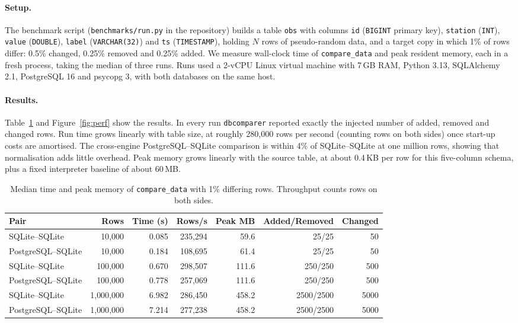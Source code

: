 \documentclass[11pt]{article}
\begin{document}
\paragraph{Setup.} The benchmark script (\texttt{benchmarks/run.py} in the
repository) builds a table \texttt{obs} with columns \texttt{id} (\texttt{BIGINT}
primary key), \texttt{station} (\texttt{INT}), \texttt{value}
(\texttt{DOUBLE}), \texttt{label} (\texttt{VARCHAR(32)}) and \texttt{ts}
(\texttt{TIMESTAMP}), holding $N$ rows of
pseudo-random data, and a target copy in which 1\% of rows differ: 0.5\%
changed, 0.25\% removed and 0.25\% added. We measure wall-clock time of
\texttt{compare\_data} and peak resident memory, each in a fresh process,
taking the median of three runs. Runs used a 2-vCPU Linux virtual machine
with 7\,GB RAM, Python 3.13, SQLAlchemy 2.1, PostgreSQL 16 and psycopg 3,
with both databases on the same host.

\paragraph{Results.} Table~\ref{tab:perf} and Figure~\ref{fig:perf} show
the results. In every run \texttt{dbcomparer} reported exactly the injected
number of added, removed and changed rows. Run time grows linearly with
table size, at roughly 280{,}000 rows per second (counting rows on both
sides) once start-up costs are amortised. The cross-engine PostgreSQL--SQLite
comparison is within 4\% of SQLite--SQLite at one million rows, showing that
normalisation adds little overhead. Peak memory grows linearly with the
source table, at about 0.4\,KB per row for this five-column schema, plus a
fixed interpreter baseline of about 60\,MB.

\begin{table}[t]
\centering
\caption{Median time and peak memory of \texttt{compare\_data} with 1\%
differing rows. Throughput counts rows on both sides.}
\label{tab:perf}
\begin{tabular}{lrrrrrr}
\toprule
Pair & Rows & Time (s) & Rows/s & Peak MB & Added/Removed & Changed\\
\midrule
SQLite--SQLite     & 10{,}000    & 0.085 & 235{,}294 & 59.6  & 25/25     & 50\\
PostgreSQL--SQLite & 10{,}000    & 0.184 & 108{,}695 & 61.4  & 25/25     & 50\\
SQLite--SQLite     & 100{,}000   & 0.670 & 298{,}507 & 111.6 & 250/250   & 500\\
PostgreSQL--SQLite & 100{,}000   & 0.778 & 257{,}069 & 111.6 & 250/250   & 500\\
SQLite--SQLite     & 1{,}000{,}000 & 6.982 & 286{,}450 & 458.2 & 2500/2500 & 5000\\
PostgreSQL--SQLite & 1{,}000{,}000 & 7.214 & 277{,}238 & 458.2 & 2500/2500 & 5000\\
\bottomrule
\end{tabular}
\end{table}
\end{document}
